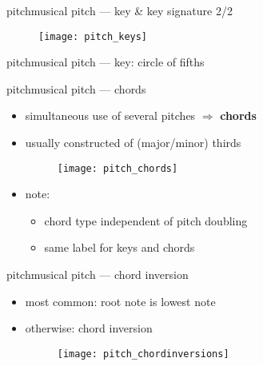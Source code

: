         \begin{frame}{pitch}{musical pitch --- key \& key signature 2/2}
                \begin{figure}[t]
                    \centering
                    \texttt{[image: pitch\_keys]}
                \end{figure}
        \end{frame}
        
        \begin{frame}{pitch}{musical pitch --- key: circle of fifths}
            \scalebox{.9}
            {
                    \centering
                    
            }					
        \end{frame}
        
        \begin{frame}{pitch}{musical pitch --- chords}
            \begin{itemize}
                \item	simultaneous use of several pitches $\Rightarrow$ \textbf{chords}
                \item	usually constructed of (major/minor) thirds
                \begin{figure}[t]
                    \centering
                    \texttt{[image: pitch\_chords]}
                \end{figure}
                \pause
                
                \item	note:
                        \begin{itemize}
                            \item	chord type independent of pitch doubling
                            \item	same label for keys and chords
                        \end{itemize}
            \end{itemize}
        \end{frame}
        
        \begin{frame}{pitch}{musical pitch --- chord inversion}
            \begin{itemize}
                \item	most common: root note is lowest note
                \item	otherwise: chord inversion
                \begin{figure}[t]
                    \centering
                    \texttt{[image: pitch\_chordinversions]}
                \end{figure}
                
            \end{itemize}
        \end{frame}
        
